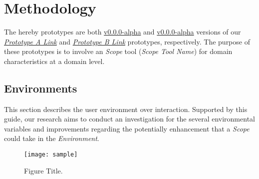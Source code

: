
\section{Methodology}
\label{sec:sec003}

The hereby prototypes are both \hyperlink{}{v0.0.0-alpha} and \hyperlink{}{v0.0.0-alpha} versions of our {\it \hyperlink{}{Prototype A Link}} and {\it \hyperlink{}{Prototype B Link}} prototypes, respectively. The purpose of these prototypes is to involve an \textit{Scope} tool (\textit{Scope Tool Name}) for domain characteristics at a domain level\cite{kobashi2017evaluation}.


\subsection{Environments}

This section describes the user environment over interaction. Supported by this guide, our research aims to conduct an investigation for the several environmental variables and improvements regarding the potentially enhancement that a \textit{Scope} could take in the {\it Environment}.


\hfill

\begin{figure}[h]
\centering
\texttt{[image: sample]}
\caption{Figure Title.}
\label{fig:fig001}
\end{figure}

\hfill




